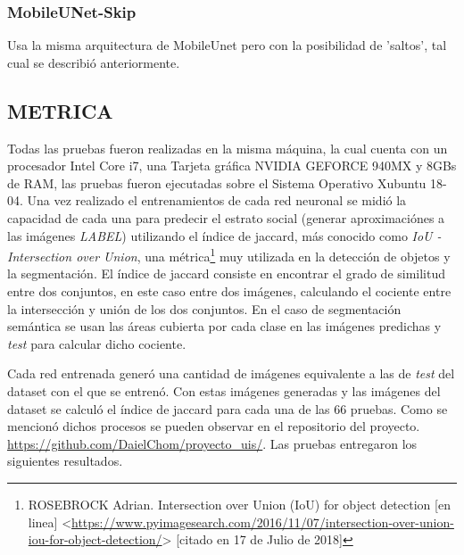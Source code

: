 \subsubsection{MobileUNet-Skip} Usa la misma arquitectura de MobileUnet pero con la posibilidad de 'saltos', tal cual se describió anteriormente. 

\subsection{METRICA}
Todas las pruebas fueron realizadas en la misma máquina, la cual cuenta con un procesador Intel Core i7, una Tarjeta gráfica NVIDIA GEFORCE 940MX y 8GBs de RAM, las pruebas fueron ejecutadas sobre el Sistema Operativo Xubuntu 18-04. Una vez realizado el entrenamientos de cada red neuronal se midió la capacidad de cada una para predecir el estrato social (generar aproximaciónes a las imágenes \textit{LABEL}) utilizando el índice de jaccard, más conocido como  \textit{IoU  - Intersection over Union}, una métrica\footnote[22]{ROSEBROCK Adrian. Intersection over Union (IoU) for object detection [en linea] <\url{https://www.pyimagesearch.com/2016/11/07/intersection-over-union-iou-for-object-detection/}> [citado en 17 de Julio de 2018]} muy utilizada en la detección de objetos y la segmentación. El índice de jaccard consiste en encontrar el grado de similitud entre dos conjuntos, en este caso entre dos imágenes, calculando el cociente entre la intersección y unión de los dos conjuntos. En el caso de segmentación semántica se usan las áreas cubierta por cada clase en las imágenes predichas y \textit{test} para calcular dicho cociente.  



Cada red entrenada generó una cantidad de imágenes equivalente a las de \textit{test} del dataset con el que se entrenó. Con estas imágenes generadas y las imágenes del dataset se calculó el índice de jaccard para cada una de las 66 pruebas. Como se mencionó dichos procesos se pueden observar en el repositorio del proyecto. \url{https://github.com/DaielChom/proyecto_uis/}. Las pruebas entregaron los siguientes resultados. 



